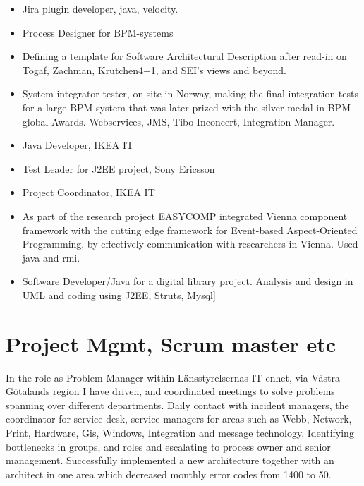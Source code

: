 \documentclass[11pt,a4paper,sans]{moderncv}
\begin{document}
{\begin{itemize}
    \item Jira plugin developer, java, velocity. 
    \item Process Designer for BPM-systems 
    \item Defining a template for Software Architectural Description after read-in on Togaf, Zachman, Krutchen4+1, and SEI’s views and beyond. 
    \item  System integrator tester, on site in Norway, making the final integration tests for a large BPM system that was later prized with the silver medal in BPM global Awards. Webservices, JMS, Tibo Inconcert, Integration Manager. 
    \item Java Developer, IKEA IT 
    \item Test Leader for J2EE project, Sony Ericsson 
    \item Project Coordinator, IKEA IT 
\end{itemize}

\begin{itemize}
 \item As part of the research project EASYCOMP integrated Vienna component framework with the cutting edge framework for Event-based Aspect-Oriented Programming, by effectively communication with researchers in Vienna. Used java and rmi. 

 \item Software Developer/Java for a digital library project. Analysis and design in UML and coding using J2EE, Struts, Mysql] 
\end{itemize}


\large
\section {Project Mgmt, Scrum master etc}


In the role as Problem Manager within Länsstyrelsernas IT-enhet, via Västra Götalands region I have driven, and coordinated meetings to solve problems spanning over different departments. Daily contact with incident managers, the coordinator for service desk, service managers for areas such as Webb, Network, Print, Hardware, Gis, Windows, Integration and message technology. Identifying bottlenecks in groups, and roles and escalating to process owner and senior management. Successfully implemented a new architecture together with an architect in one area which decreased monthly error codes from 1400 to 50.  

}
\end{document}
